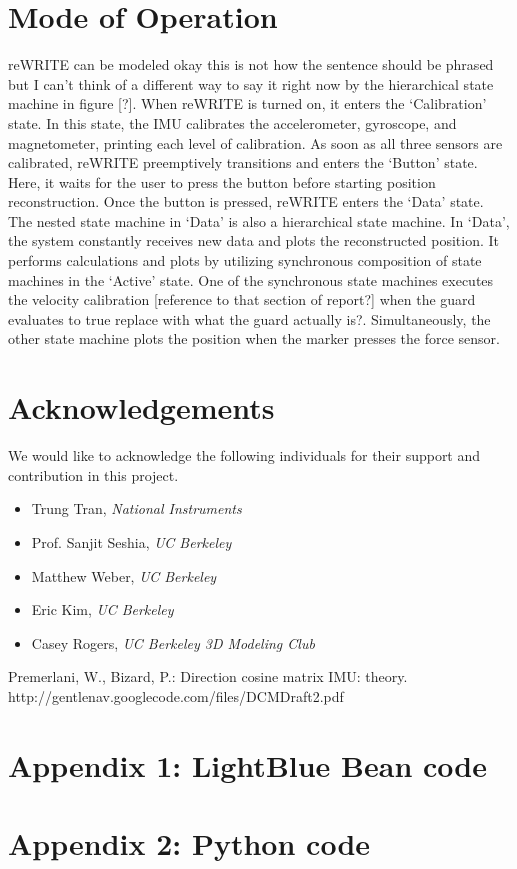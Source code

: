\documentclass[12pt,journal]{IEEEtran}
\begin{document}
\section{Mode of Operation}
	reWRITE can be modeled okay this is not how the sentence should be phrased but I can’t think of a different way to say it right now by the hierarchical state machine in figure [?]. 
When reWRITE is turned on, it enters the ‘Calibration’ state. In this state, the IMU calibrates the accelerometer, gyroscope, and magnetometer, printing each level of calibration. As soon as all three sensors are calibrated, reWRITE preemptively transitions and enters the ‘Button’ state. Here, it waits for the user to press the button before starting position reconstruction. Once the button is pressed, reWRITE enters the ‘Data’ state. The nested state machine in ‘Data’ is also a hierarchical state machine. In ‘Data’, the system constantly receives new data and plots the reconstructed position. It performs calculations and plots by utilizing synchronous composition of state machines in the ‘Active’ state. One of the synchronous state machines executes the velocity calibration [reference to that section of report?] when the guard evaluates to true replace with what the guard actually is?. Simultaneously, the other state machine plots the position when the marker presses the force sensor. 

\section{Acknowledgements}
We would like to acknowledge the following individuals for their support and contribution in this project.
\begin{itemize}
\item Trung Tran, \textit{National Instruments}
\item Prof. Sanjit Seshia, \textit{UC Berkeley}
\item Matthew Weber, \textit{UC Berkeley}
\item Eric Kim, \textit{UC Berkeley}
\item Casey Rogers, \textit{UC Berkeley 3D Modeling Club}
\end{itemize}

\begin{thebibliography}{1}
 Premerlani, W., Bizard, P.: Direction cosine matrix	IMU: theory. http://gentlenav.googlecode.com/files/DCMDraft2.pdf
\end{thebibliography}

\newpage
\onecolumn

\section{Appendix 1: LightBlue Bean code}
\small{

}

\section{Appendix 2: Python code}
\small{

}
\end{document}

